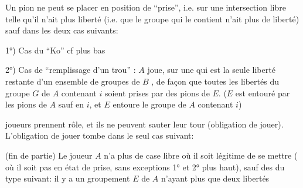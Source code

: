Un pion ne peut se placer en position de ``prise'', i.e.
sur une intersection libre telle qu'il n'ait plus
  liberté (i.e. que le groupe qui le contient
n'ait plus de liberté) sauf dans les deux
cas suivants:

1°) Cas du ``Ko'' cf plus bas

2°) Cas de ``remplissage d'un trou'' : 
$A$ joue, sur une   qui est la seule liberté restante
d'un ensemble  de groupes de $B$ , de façon que
toutes les libertés du groupe $G$ de $A$ contenant $i$
soient prises par des pions de $E$. ($E$ est entouré
par les pions de $A$ sauf en $i$, et $E$ entoure
le groupe  de $A$ contenant $i$)


  joueurs prennent   rôle, et ils ne
peuvent sauter leur tour (obligation de jouer).
L'obligation de jouer tombe dans le seul cas
suivant:

(fin de partie) Le joueur $A$ n'a plus de case
libre où il soit légitime de se mettre ( où il
 soit pas en état de prise, sans  exceptions
1° et 2° plus haut), sauf des   du type
suivant: il y a un groupement $E$ de $A$
n'ayant plus que deux libertés  
